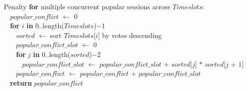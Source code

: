 \begin{tabbing}Penalty {\bf for} multiple concurrent popular sessions across $\textit{Timeslots}$$:$\\
$~~~~$$\textit{popular\_conflict}$ $\leftarrow$ $0$\\
$~~~~${\bf for} $\textit{i}$ {\bf in} $0..$length($\textit{Timeslots}$)$-1$\\
$~~~~~~~~$$\textit{sorted}$ $\leftarrow$ sort $\textit{Timeslots}$$[$$\textit{i}$$]$ by votes descending\\
$~~~~~~~~$$\textit{popular\_conflict\_slot}$ $\leftarrow$ $0$\\
$~~~~~~~~${\bf for} $\textit{j}$ {\bf in} $0..$length($\textit{sorted}$)$-2$\\
$~~~~~~~~~~~~$$\textit{popular\_conflict\_slot}$ $\leftarrow$ $\textit{popular\_conflict\_slot}$ $+$ $\textit{sorted}$$[$$\textit{j}$$]$ $*$ $\textit{sorted}$$[$$\textit{j}$ $+$ $1]$\\
$~~~~~~~~$$\textit{popular\_conflict}$ $\leftarrow$ $\textit{popular\_conflict}$ $+$ $\textit{popular\_conflict\_slot}$\\
$~~~~${\bf return} $\textit{popular\_conflict}$\\
\end{tabbing}